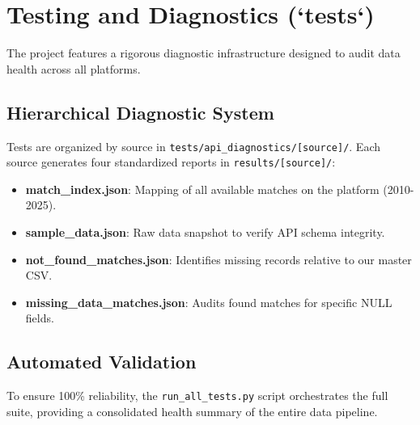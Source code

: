\section{Testing and Diagnostics (`tests`)}
The project features a rigorous diagnostic infrastructure designed to audit data health across all platforms.

\subsection{Hierarchical Diagnostic System}
Tests are organized by source in \texttt{tests/api_diagnostics/[source]/}. Each source generates four standardized reports in \texttt{results/[source]/}:
\begin{itemize}
    \item \textbf{match\_index.json}: Mapping of all available matches on the platform (2010-2025).
    \item \textbf{sample\_data.json}: Raw data snapshot to verify API schema integrity.
    \item \textbf{not\_found\_matches.json}: Identifies missing records relative to our master CSV.
    \item \textbf{missing\_data\_matches.json}: Audits found matches for specific NULL fields.
\end{itemize}

\subsection{Automated Validation}
To ensure 100\% reliability, the \texttt{run\_all\_tests.py} script orchestrates the full suite, providing a consolidated health summary of the entire data pipeline.
